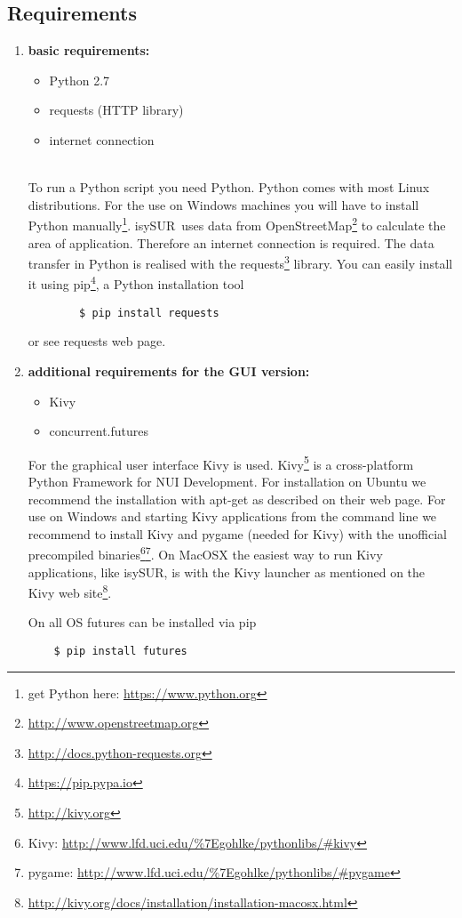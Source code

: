 \documentclass[11pt,fleqn]{book} %
\newcommand{\ProjectTitle}{isySUR}
\newcommand{\pt}{\ProjectTitle}
\begin{document}
\subsection{Requirements}\label{sec:requirements}
\begin{enumerate}
	\item \textbf{basic requirements:}
	\begin{itemize}
		\item Python 2.7
		\item requests (HTTP library)
		\item internet connection
	\end{itemize}
	~\\
	To run a Python script you need Python. Python comes with most Linux distributions. For the use on Windows machines you will have to install Python manually\footnote{get Python here: \url{https://www.python.org}}. \pt\ uses data from OpenStreetMap\footnote{\url{http://www.openstreetmap.org}} to calculate the area of application. Therefore an internet connection is required. The data transfer in Python is realised with the requests\footnote{\url{http://docs.python-requests.org}\label{fn:requests}} library. You can easily install it using pip\footnote{\url{https://pip.pypa.io}}, a Python installation tool
	\begin{verbatim}
		$ pip install requests
	\end{verbatim}
	or see requests web page.
	\newpage
	\item \textbf{additional requirements for the GUI version:}
	\begin{itemize}
		\item Kivy
		\item concurrent.futures
	\end{itemize}
	For the graphical user interface Kivy is used. Kivy\footnote{\url{http://kivy.org}} is a cross-platform Python Framework for NUI Development. For installation on Ubuntu we recommend the installation with apt-get as described on their web page. For use on Windows and starting Kivy applications from the command line we recommend to install Kivy and pygame (needed for Kivy) with the unofficial precompiled binaries\footnote{Kivy: \url{http://www.lfd.uci.edu/\%7Egohlke/pythonlibs/\#kivy}}\footnote{pygame: \url{http://www.lfd.uci.edu/\%7Egohlke/pythonlibs/\#pygame}}. On MacOSX the easiest way to run Kivy applications, like \pt, is with the Kivy launcher as mentioned on the Kivy web site\footnote{\url{http://kivy.org/docs/installation/installation-macosx.html}}.
	
On all OS futures can be installed via pip
\begin{verbatim}
	$ pip install futures
\end{verbatim}
\end{enumerate}
\end{document}
